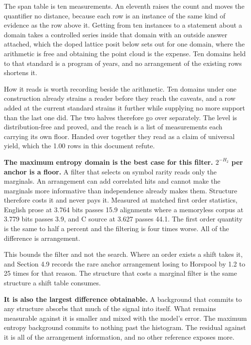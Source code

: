 The span table is ten measurements. An eleventh raises the count and moves the quantifier no distance, because each row is an instance of the same kind of evidence as the row above it. Getting from ten instances to a statement about a domain takes a controlled series inside that domain with an outside answer attached, which the doped lattice posit below sets out for one domain, where the arithmetic is free and obtaining the point cloud is the expense. Ten domains held to that standard is a program of years, and no arrangement of the existing rows shortens it.

How it reads is worth recording beside the arithmetic. Ten domains under one construction already strains a reader before they reach the caveats, and a row added at the current standard strains it further while supplying no more support than the last one did. The two halves therefore go over separately. The level is distribution-free and proved, and the reach is a list of measurements each carrying its own floor. Handed over together they read as a claim of universal yield, which the 1.00 rows in this document refute.

\textbf{The maximum entropy domain is the best case for this filter. \(2^{-H_2}\) per anchor is a floor.} A filter that selects on symbol rarity reads only the marginals. An arrangement can add correlated hits and cannot make the marginals more informative than independence already makes them. Structure therefore costs it and never pays it. Measured at matched first order statistics, English prose at 3.764 bits passes 15.9 alignments where a memoryless corpus at 3.779 bits passes 3.9, and C source at 3.627 passes 44.1. The first order quantity is the same to half a percent and the filtering is four times worse. All of the difference is arrangement.

This bounds the filter and not the search. Where an order exists a shift takes it, and Section 4.9 records the rare anchor arrangement losing to Horspool by 1.2 to 25 times for that reason. The structure that costs a marginal filter is the same structure a shift table consumes.

\textbf{It is also the largest difference obtainable.} A background that commits to any structure absorbs that much of the signal into itself. What remains measurable against it is smaller and mixed with the model's error. The maximum entropy background commits to nothing past the histogram. The residual against it is all of the arrangement information, and no other reference exposes more.

